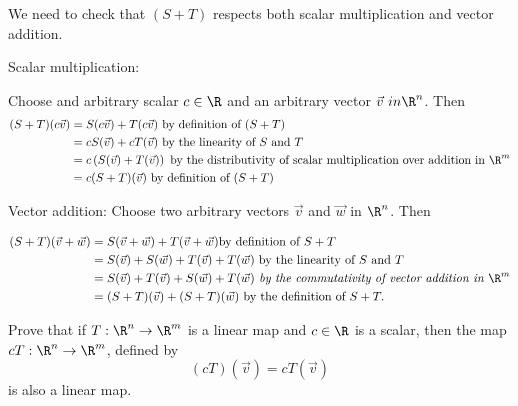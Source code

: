 \documentclass{ximera}
\begin{document}
\begin{free-response} 
 We need to check that $(S+T)$ respects both scalar multiplication and vector addition.
 
 Scalar multiplication:
 
 Choose and arbitrary scalar $c \in \R$ and an arbitrary vector $\vec{v} \ in \R^n$.  Then
 	\begin{align*}
 	(S+T)(c\vec{v}) &=S(c\vec{v})+T(c\vec{v}) \text{ by definition of } (S+T)\\
 	&= cS(\vec{v})+cT(\vec{v}) \text{ by the linearity of } S \text{ and } T\\
 	&=c\left( S(\vec{v}) + T(\vec{v})\right) \text{ by the distributivity of scalar multiplication over addition in } \R^m\\
 	&=c(S+T)(\vec{v}) \text{ by definition of } (S+T)
 	\end{align*}
 	
 	Vector addition:
 	Choose two arbitrary vectors $\vec{v}$ and $\vec{w}$ in $\R^n$.  Then
 	
 	\begin{align*}
 		(S+T)(\vec{v} +\vec{w}) &= S(\vec{v}+\vec{w})+T(\vec{v}+\vec{w}) \text{by definition of } S+T\\
 		&= S(\vec{v})+S(\vec{w})+T(\vec{v})+T(\vec{w}) \text{ by the linearity of } S \text{ and } T\\
 		&= S(\vec{v})+T(\vec{v}) + S(\vec{w})+T(\vec{w}) \textit{ by the commutativity of vector addition in } \R^m\\
 		&=(S+T)(\vec{v})+(S+T)(\vec{w}) \text{ by the definition of } S+T.
 	\end{align*}
\end{free-response}



Prove that if $T:\R^n \to \R^m$ is a linear map and $c \in \R$ is a scalar, then the map $cT:\R^n \to \R^m$,  defined by 
\[(cT)(\vec{v}) = cT(\vec{v})\] is also a linear map.
  
\end{document}
